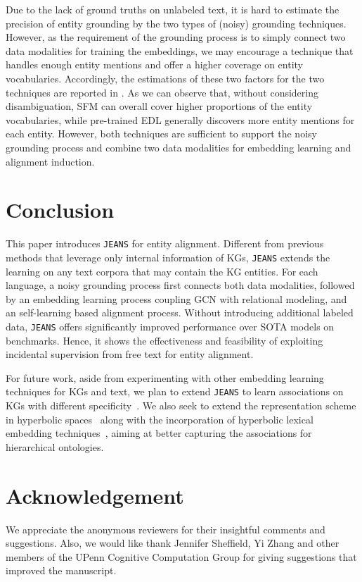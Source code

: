 \documentclass[11pt,a4paper]{article}
\newcommand{\modelname}[0]{\texttt{JEANS}\xspace}
\begin{document}
Due to the lack of ground truths on unlabeled text, it is hard to estimate the precision of entity grounding by the two types of (noisy) grounding techniques.
However, as the requirement of the grounding process is to simply connect two data modalities for training the embeddings, 
we may encourage a technique that handles enough entity mentions and offer a higher coverage on entity vocabularies.
Accordingly, the estimations of these two factors for the two techniques are reported in .
As we can observe that, without considering disambiguation, SFM can overall cover higher proportions of the entity vocabularies, while pre-trained EDL generally discovers more entity mentions for each entity.
However, both techniques are sufficient to support the noisy grounding process and combine two data modalities for embedding learning and alignment induction.
%
 \section{Conclusion}

This paper introduces \modelname for entity alignment.
Different from previous methods that leverage only internal information of KGs, \modelname extends the learning on any text corpora that may contain the KG entities.
For each language, a noisy grounding process first connects both data modalities, followed by an embedding learning process coupling GCN with relational modeling, and an self-learning based alignment process.
Without introducing additional labeled data,
\modelname offers significantly improved performance over SOTA models on benchmarks.
Hence, it shows the effectiveness and feasibility of exploiting incidental supervision from free text for entity alignment.

For future work, aside from experimenting with other embedding learning techniques for KGs and text, we plan to extend \modelname to learn associations on KGs with different specificity~\cite{hao2019joie}.
We also seek to extend the representation scheme in hyperbolic spaces~\cite{nickel2017poincare,chen2019edge} along with the incorporation of hyperbolic lexical embedding techniques~\cite{tifrea2018poincare}, aiming at better capturing the associations for hierarchical ontologies.


\section*{Acknowledgement}
We appreciate the anonymous reviewers for their insightful comments and suggestions.
Also, we would like thank Jennifer Sheffield, Yi Zhang and other members of 
the UPenn Cognitive Computation Group for giving suggestions 
that improved 
the manuscript.
\end{document}
